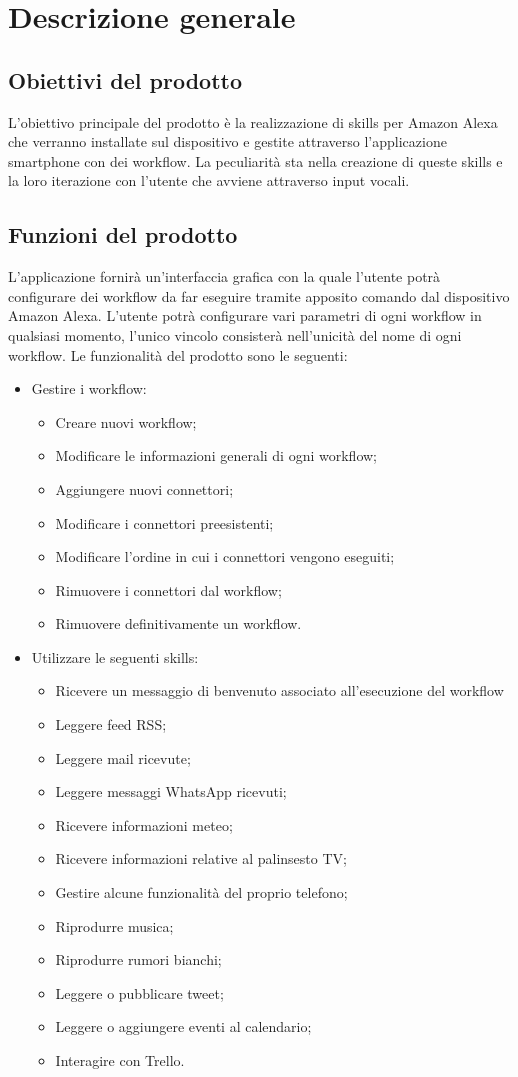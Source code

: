 \clearpage
\section{Descrizione generale}
\label{sec:desc_gen}
\subsection{Obiettivi del prodotto}
L'obiettivo principale del prodotto è la realizzazione di skills per Amazon Alexa che verranno installate sul dispositivo e gestite attraverso l'applicazione smartphone con dei workflow. La peculiarità sta nella creazione di queste skills e la loro iterazione con l'utente che avviene attraverso input vocali.
\subsection{Funzioni del prodotto}
L'applicazione fornirà un'interfaccia grafica con la quale l'utente potrà configurare dei workflow da far eseguire tramite apposito comando dal dispositivo Amazon Alexa. L'utente potrà configurare vari parametri di ogni workflow in qualsiasi momento, l'unico vincolo consisterà nell'unicità del nome di ogni workflow.
Le funzionalità del prodotto sono le seguenti: 
\begin{itemize}
	\item Gestire i workflow:
	\begin{itemize}
		\item Creare nuovi workflow;
		\item Modificare le informazioni generali di ogni workflow;
		\item Aggiungere nuovi connettori;
		\item Modificare i connettori preesistenti;
		\item Modificare l'ordine in cui i connettori vengono eseguiti;
		\item Rimuovere i connettori dal workflow;
		\item Rimuovere definitivamente un workflow.
	\end{itemize}
	\item Utilizzare le seguenti skills:
	\begin{itemize}
		\item Ricevere un messaggio di benvenuto associato all'esecuzione del workflow
		\item Leggere feed RSS;
		\item Leggere mail ricevute;
		\item Leggere messaggi WhatsApp ricevuti;
		\item Ricevere informazioni meteo;
		\item Ricevere informazioni relative al palinsesto TV;
		\item Gestire alcune funzionalità del proprio telefono;
		\item Riprodurre musica;
		\item Riprodurre rumori bianchi;
		\item Leggere o pubblicare tweet;
		\item Leggere o aggiungere eventi al calendario;
		\item Interagire con Trello.
	\end{itemize}
\end{itemize}
